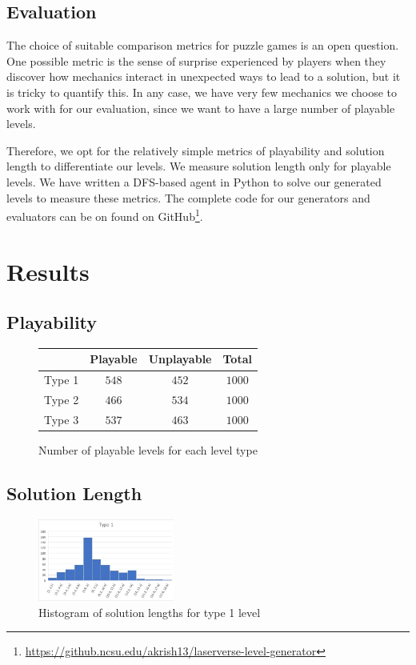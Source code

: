 \documentclass[letterpaper]{article}
\begin{document}
\subsection{Evaluation}
The choice of suitable comparison metrics for puzzle games is an open question. One possible metric is the sense of
surprise experienced by players when they discover how mechanics interact in unexpected ways to lead to a solution, but
it is tricky to quantify this. In any case, we have very few mechanics we choose to work with for our evaluation, since
we want to have a large number of playable levels.

Therefore, we opt for the relatively simple metrics of playability and solution length to differentiate our levels. We
measure solution length only for playable levels. We have written a DFS-based agent in Python to solve our generated
levels to measure these metrics. The complete code for our generators and evaluators can be on found on
GitHub\footnote{\url{https://github.ncsu.edu/akrish13/laserverse-level-generator}}.

\section{Results}

\subsection{Playability}
\begin{figure}[h]
    \centering
    \begin{tabular}{|c|c|c|c|}
        \hline
               & Playable & Unplayable & Total  \\
        \hline
        Type 1 & $548$    & $452$      & $1000$ \\
        \hline
        Type 2 & $466$    & $534$      & $1000$ \\
        \hline
        Type 3 & $537$    & $463$      & $1000$ \\
        \hline
    \end{tabular}
    \caption{Number of playable levels for each level type}
    \label{tab:playable}
\end{figure}

\subsection{Solution Length}
\begin{figure}[h]
    \centering
    \includegraphics[width=0.4\textwidth]{img/crate.jpg}
    \caption{Histogram of solution lengths for type 1 level}
    \label{fig:crate}
\end{figure}
\end{document}
